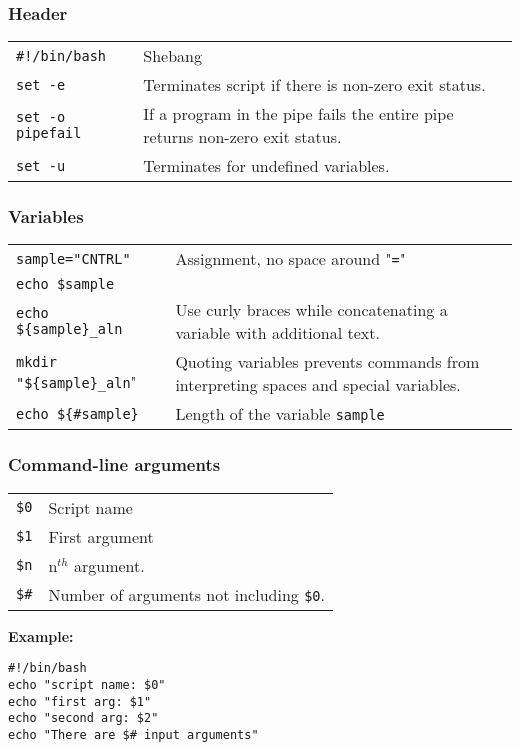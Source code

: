 \subsubsection{Header}

\begin{tabularx}{\linewidth}{lX}
\texttt{\#!/bin/bash} & Shebang\\
\texttt{set -e} & Terminates script if there is non-zero exit status.\\
\texttt{set -o pipefail} & If a program in the pipe fails the entire pipe returns non-zero exit status.\\
\texttt{set -u} & Terminates for undefined variables.\\
\end{tabularx}

\subsubsection{Variables}
\begin{tabularx}{\linewidth}{lX}
\texttt{sample="CNTRL"} & Assignment, no space around "\texttt{=}"\\
\texttt{echo \$sample} & \\
\texttt{echo \$\{sample\}\_aln} & Use curly braces while concatenating a variable with additional text.\\
\texttt{mkdir "\$\{sample\}\_aln}" & Quoting variables prevents commands from interpreting spaces and special variables.\\
\texttt{echo \$\{\#sample\}} & Length of the variable \texttt{sample}
\end{tabularx}

\subsubsection{Command-line arguments}
\begin{tabularx}{\linewidth}{lX}
\texttt{\$0} & Script name\\
\texttt{\$1} & First argument\\
\texttt{\$n} & n$^{th}$ argument.\\
\texttt{\$\#} & Number of arguments not including \texttt{\$0}.\\
\end{tabularx}

\textbf{Example:}\\
\begin{mdframed}
\texttt{\#!/bin/bash}\\
\texttt{echo "script name: \$0"}\\
\texttt{echo "first arg: \$1"}\\
\texttt{echo "second arg: \$2"}\\
\texttt{echo "There are \$\# input arguments"}
\end{mdframed}

